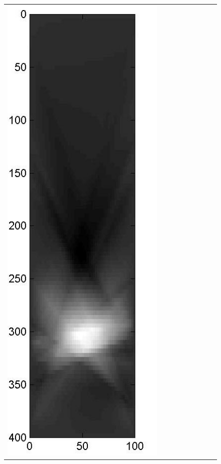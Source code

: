\documentclass[11pt]{article}
\begin{document}
\begin{figure}[!h]
\begin{center}
\begin{tabular}{|c|c|c|c|c|c|c|c|c|}
			\includegraphics[width=.9\iwidth]{figures/newFigs/noisy/resultsExp-7-mk}
			&

\end{tabular}
\end{center}
\end{figure}
\end{document}
